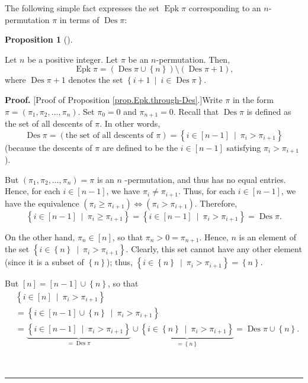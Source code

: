 \documentclass[numbers=enddot,12pt,final,onecolumn,notitlepage]{scrartcl}%
\theoremstyle{definition}
\newtheorem{prop}[theo]{Proposition}
\newenvironment{proposition}[1][]
{\begin{prop}[#1]\begin{leftbar}}
{\end{leftbar}\end{prop}}
\newenvironment{proof}[1][Proof]{\noindent\textbf{#1.} }{\ \rule{0.5em}{0.5em}}
\begin{document}
The following simple fact expresses the set $\operatorname*{Epk}\pi$
corresponding to an $n$-permutation $\pi$ in terms of $\operatorname*{Des}\pi$:

\begin{proposition}
\label{prop.Epk.through-Des}Let $n$ be a positive integer. Let $\pi$ be an
$n$-permutation. Then,%
\[
\operatorname*{Epk}\pi=\left(  \operatorname*{Des}\pi\cup\left\{  n\right\}
\right)  \setminus\left(  \operatorname*{Des}\pi+1\right)  ,
\]
where $\operatorname*{Des}\pi+1$ denotes the set $\left\{  i+1\ \mid
\ i\in\operatorname*{Des}\pi\right\}  $.
\end{proposition}

\begin{proof}
[Proof of Proposition \ref{prop.Epk.through-Des}.]Write $\pi$ in the form
$\pi=\left(  \pi_{1},\pi_{2},\ldots,\pi_{n}\right)  $. Set $\pi_{0}=0$ and
$\pi_{n+1}=0$. Recall that $\operatorname*{Des}\pi$ is defined as the set of
all descents of $\pi$. In other words,%
\[
\operatorname*{Des}\pi=\left(  \text{the set of all descents of }\pi\right)
=\left\{  i\in\left[  n-1\right]  \ \mid\ \pi_{i}>\pi_{i+1}\right\}
\]
(because the descents of $\pi$ are defined to be the $i\in\left[  n-1\right]
$ satisfying $\pi_{i}>\pi_{i+1}$).

But $\left(  \pi_{1},\pi_{2},\ldots,\pi_{n}\right)  =\pi$ is an $n$%
-permutation, and thus has no equal entries. Hence, for each $i\in\left[
n-1\right]  $, we have $\pi_{i}\neq\pi_{i+1}$. Thus, for each $i\in\left[
n-1\right]  $, we have the equivalence $\left(  \pi_{i}\geq\pi_{i+1}\right)
\Longleftrightarrow\left(  \pi_{i}>\pi_{i+1}\right)  $. Therefore,%
\[
\left\{  i\in\left[  n-1\right]  \ \mid\ \pi_{i}\geq\pi_{i+1}\right\}
=\left\{  i\in\left[  n-1\right]  \ \mid\ \pi_{i}>\pi_{i+1}\right\}
=\operatorname*{Des}\pi.
\]


On the other hand, $\pi_{n}\in\left[  n\right]  $, so that $\pi_{n}%
>0=\pi_{n+1}$. Hence, $n$ is an element of the set $\left\{  i\in\left\{
n\right\}  \ \mid\ \pi_{i}>\pi_{i+1}\right\}  $. Clearly, this set cannot have
any other element (since it is a subset of $\left\{  n\right\}  $); thus,
$\left\{  i\in\left\{  n\right\}  \ \mid\ \pi_{i}>\pi_{i+1}\right\}  =\left\{
n\right\}  $.

But $\left[  n\right]  =\left[  n-1\right]  \cup\left\{  n\right\}  $, so
that
\begin{align}
&  \left\{  i\in\left[  n\right]  \ \mid\ \pi_{i}>\pi_{i+1}\right\}
\nonumber\\
&  =\left\{  i\in\left[  n-1\right]  \cup\left\{  n\right\}  \ \mid\ \pi
_{i}>\pi_{i+1}\right\} \nonumber\\
&  =\underbrace{\left\{  i\in\left[  n-1\right]  \ \mid\ \pi_{i}>\pi
_{i+1}\right\}  }_{=\operatorname*{Des}\pi}\cup\underbrace{\left\{
i\in\left\{  n\right\}  \ \mid\ \pi_{i}>\pi_{i+1}\right\}  }_{=\left\{
n\right\}  }=\operatorname*{Des}\pi\cup\left\{  n\right\}  .
\label{pf.prop.Epk.through-Des.Desun}%
\end{align}



\end{proof}
\end{document}
